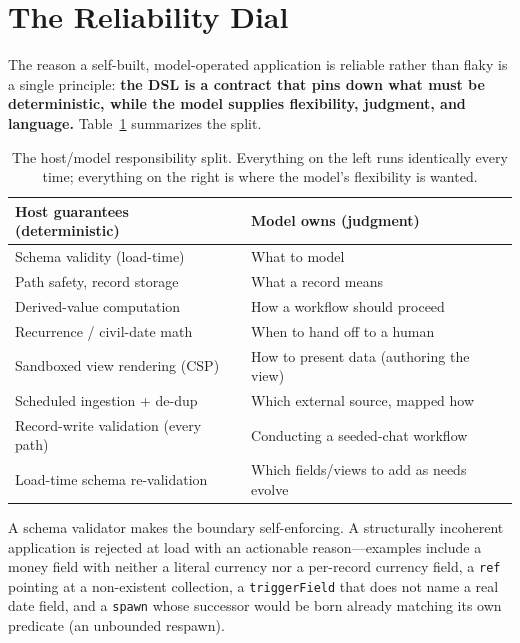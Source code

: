 \documentclass[11pt]{article}
\newcommand{\code}[1]{\texttt{\small #1}}
\begin{document}
\section{The Reliability Dial}
\label{sec:dial}

The reason a self-built, model-operated application is reliable rather than flaky
is a single principle: \textbf{the DSL is a contract that pins down what must be
deterministic, while the model supplies flexibility, judgment, and language.}
Table~\ref{tab:split} summarizes the split.

\begin{table}[t]
\centering
\small
\begin{tabular}{@{}ll@{}}
\toprule
\textbf{Host guarantees (deterministic)} & \textbf{Model owns (judgment)} \\
\midrule
Schema validity (load-time)        & What to model \\
Path safety, record storage        & What a record means \\
Derived-value computation          & How a workflow should proceed \\
Recurrence / civil-date math       & When to hand off to a human \\
Sandboxed view rendering (CSP)     & How to present data (authoring the view) \\
Scheduled ingestion + de-dup       & Which external source, mapped how \\
Record-write validation (every path) & Conducting a seeded-chat workflow \\
Load-time schema re-validation     & Which fields/views to add as needs evolve \\
\bottomrule
\end{tabular}
\caption{The host/model responsibility split. Everything on the left runs
identically every time; everything on the right is where the model's flexibility
is wanted.}
\label{tab:split}
\end{table}

A schema validator makes the boundary self-enforcing. A structurally incoherent
application is rejected at load with an actionable reason---examples include a
money field with neither a literal currency nor a per-record currency field, a
\code{ref} pointing at a non-existent collection, a \code{triggerField} that does
not name a real date field, and a \code{spawn} whose successor would be born
already matching its own predicate (an unbounded respawn).
\end{document}
